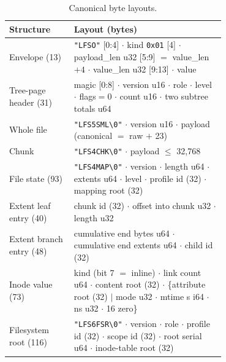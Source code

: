 \begin{table}[h]
\centering
\small
\begin{tabular}{l p{0.7\linewidth}}
\toprule
Structure & Layout (bytes) \\
\midrule
Envelope (13) & \texttt{"LFSO"} [0:4] $\cdot$ kind \texttt{0x01} [4] $\cdot$ payload\_len u32 [5:9] $=$ value\_len$+4$ $\cdot$ value\_len u32 [9:13] $\cdot$ value \\
Tree-page header (31) & magic [0:8] $\cdot$ version u16 $\cdot$ role $\cdot$ level $\cdot$ flags$=0$ $\cdot$ count u16 $\cdot$ two subtree totals u64 \\
Whole file & \texttt{"LFS5SML\textbackslash 0"} $\cdot$ version u16 $\cdot$ payload (canonical $=$ raw $+$ 23) \\
Chunk & \texttt{"LFS4CHK\textbackslash 0"} $\cdot$ payload $\leq$ 32,768 \\
File state (93) & \texttt{"LFS4MAP\textbackslash 0"} $\cdot$ version $\cdot$ length u64 $\cdot$ extents u64 $\cdot$ level $\cdot$ profile id (32) $\cdot$ mapping root (32) \\
Extent leaf entry (40) & chunk id (32) $\cdot$ offset into chunk u32 $\cdot$ length u32 \\
Extent branch entry (48) & cumulative end bytes u64 $\cdot$ cumulative end extents u64 $\cdot$ child id (32) \\
Inode value (73) & kind (bit 7 $=$ inline) $\cdot$ link count u64 $\cdot$ content root (32) $\cdot$ \{attribute root (32) $|$ mode u32 $\cdot$ mtime s i64 $\cdot$ ns u32 $\cdot$ 16 zero\} \\
Filesystem root (116) & \texttt{"LFS6FSR\textbackslash 0"} $\cdot$ version $\cdot$ role $\cdot$ profile id (32) $\cdot$ scope id (32) $\cdot$ root serial u64 $\cdot$ inode-table root (32) \\
\bottomrule
\end{tabular}
\caption{Canonical byte layouts.}
\label{tab:layouts}
\end{table}

